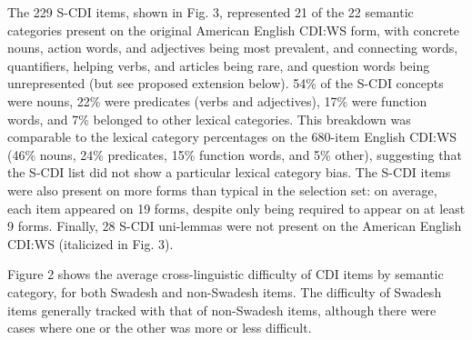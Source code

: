\documentclass[10pt, letterpaper]{article}
\begin{document}
The 229 S-CDI items, shown in Fig. 3, represented 21 of the 22 semantic
categories present on the original American English CDI:WS form, with
concrete nouns, action words, and adjectives being most prevalent, and
connecting words, quantifiers, helping verbs, and articles being rare,
and question words being unrepresented (but see proposed extension
below). 54\% of the S-CDI concepts were nouns, 22\% were predicates
(verbs and adjectives), 17\% were function words, and 7\% belonged to
other lexical categories. This breakdown was comparable to the lexical
category percentages on the 680-item English CDI:WS (46\% nouns, 24\%
predicates, 15\% function words, and 5\% other), suggesting that the
S-CDI list did not show a particular lexical category bias. The S-CDI
items were also present on more forms than typical in the selection set:
on average, each item appeared on 19 forms, despite only being required
to appear on at least 9 forms. Finally, 28 S-CDI uni-lemmas were not
present on the American English CDI:WS (italicized in Fig. 3).

Figure 2 shows the average cross-linguistic difficulty of CDI items by
semantic category, for both Swadesh and non-Swadesh items. The
difficulty of Swadesh items generally tracked with that of non-Swadesh
items, although there were cases where one or the other was more or less
difficult.
\end{document}
